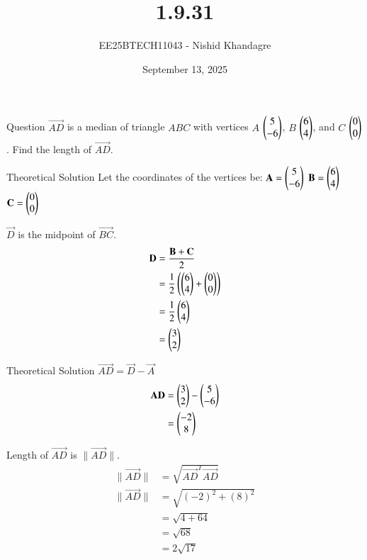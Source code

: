 \documentclass{beamer}
\title
{1.9.31}
\date{September 13, 2025}
\author
{EE25BTECH11043 - Nishid Khandagre}
\begin{document}
\frame{\titlepage}

\begin{frame}{Question}
$\vec{AD}$ is a median of triangle $ABC$ with vertices $A$ $\begin{pmatrix} 5\\-6\end{pmatrix}$, $B$ $\begin{pmatrix} 6\\4 \end{pmatrix}$, and $C$ $\begin{pmatrix} 0\\0 \end{pmatrix}$. Find the length of $\vec{AD}$.
\end{frame}


\begin{frame}{Theoretical Solution}
Let the coordinates of the vertices be:
$\mathbf{A} = \begin{pmatrix}5 \\ -6\end{pmatrix}$
$\mathbf{B} = \begin{pmatrix}6 \\ 4\end{pmatrix}$
$\mathbf{C} = \begin{pmatrix}0 \\ 0\end{pmatrix}$

$\vec{D}$ is the midpoint of $\vec{BC}$.
\begin{align}
\mathbf{D} &= \frac{\mathbf{B} + \mathbf{C}}{2} \\
&= \frac{1}{2}\left(\begin{pmatrix}6 \\ 4\end{pmatrix} + \begin{pmatrix}0 \\ 0\end{pmatrix}\right) \\
&= \frac{1}{2}\begin{pmatrix}6 \\ 4\end{pmatrix} \\
&= \begin{pmatrix}3 \\ 2\end{pmatrix}
\end{align}
\end{frame}

\begin{frame}{Theoretical Solution}
$\vec{AD} = \vec{D} - \vec{A}$
\begin{align}
\mathbf{AD} &= \begin{pmatrix}3 \\ 2\end{pmatrix} - \begin{pmatrix}5 \\ -6\end{pmatrix} \\
&= \begin{pmatrix}-2 \\ 8\end{pmatrix}
\end{align}

Length of $\vec{AD}$ is $\|\vec{AD}\|$.
\begin{align}
\|\vec{AD}\| &= \sqrt{\vec{AD}^T\vec{AD}}\\
\|\vec{AD}\| &= \sqrt{(-2)^2 + (8)^2} \\
&= \sqrt{4 + 64} \\
&= \sqrt{68} \\
&= 2\sqrt{17}
\end{align}
\end{frame}
\end{document}
